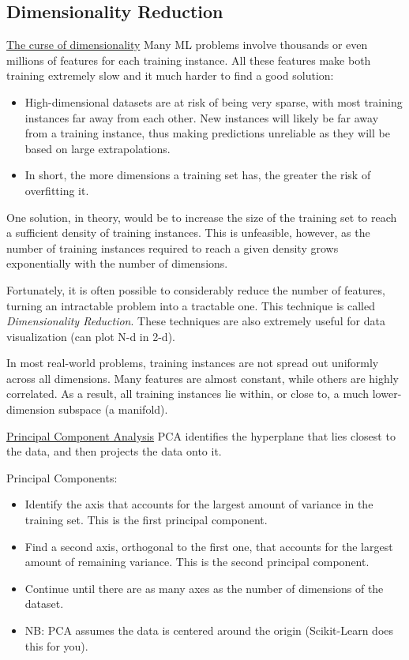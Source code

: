 \subsection{Dimensionality Reduction}

\underline{The curse of dimensionality}\newline
Many ML problems involve thousands or even millions of features for each training instance.
All these features make both training extremely slow
and it much harder to find a good solution:

\vspace{-3.0mm}
\begin{itemize}
\item
High-dimensional datasets are at risk of being very sparse,
with most training instances far away from each other.
New instances will likely be far away from a training instance,
thus making predictions unreliable as they will be based on large extrapolations.
\item
In short, the more dimensions a training set has,
the greater the risk of overfitting it.
\end{itemize}

\vspace{-3.0mm}
One solution, in theory,
would be to increase the size of the training set to reach a sufficient density of training instances.
This is unfeasible, however,
as the number of training instances required to reach a given density grows exponentially with the number of dimensions.

Fortunately,
it is often possible to considerably reduce the number of features,
turning an intractable problem into a tractable one.
This technique is called \textit{Dimensionality Reduction}.\newline
These techniques are also extremely useful for data visualization (can plot N-d in 2-d).

In most real-world problems,
training instances are not spread out uniformly across all dimensions.
Many features are almost constant, while others are highly correlated.
As a result,
all training instances lie within, or close to,
a much lower-dimension subspace (a manifold).

\underline{Principal Component Analysis}\newline
PCA identifies the hyperplane that lies closest to the data,
and then projects the data onto it.

Principal Components:
\vspace{-3.0mm}
\begin{itemize}
\item
Identify the axis that accounts for the largest amount of variance in the training set.
This is the first principal component.
\item
Find a second axis, orthogonal to the first one,
that accounts for the largest amount of remaining variance.
This is the second principal component.
\item
Continue until there are as many axes as the number of dimensions of the dataset.
\item
NB: PCA assumes the data is centered around the origin (Scikit-Learn does this for you).
\end{itemize}

